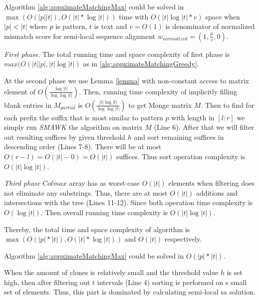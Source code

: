 \begin{theorem}
Algorithm \ref{alg:appximateMatchingMax} could  be solved in
$\max (O(|p||t|), O(|t|* \log |t|))$ time with $O(|t|  \log {|t| * v })$ space when $|p|<|t|$ where $p$ is pattern, $t$ is text and $v=O(1)$ is denominator of normalized mismatch score for semi-local sequence alignment
$w_{normalized} = (1,\frac{\mu}{v},0)$.
\end{theorem}

\emph{First phase}.
The total running time and space complexity of first phase is 
$max(O(|t||p|, |t| \log |t|)$ as in \ref{alg:appximateMatchingGreedy}.


At the second phase we use Lemma \ref{lemma} with non-constant access to matrix element of $O(\frac{\log |t|}{\log \log |t|})$.
Then, running time complexity of implicitly filling
blank entries in $M_{partial}$ is 
$O(\frac{|t| \log |t|}{\log \log |t|})$ to get Monge matrix $M$.
Then to find for each prefix the suffix that is most similar to pattern $p$ with length in $[l:r]$ we simply run \emph{SMAWK}
the algorithm on matrix $M$ (Line 6).
After that we will filter out resulting suffices by given threshold $h$ and sort remaining suffices in descending order (Lines 7-8).
There will be at most $O(r-l)=O(|t| - 0) = O(|t|)$ suffices.
Thus sort operation complexity  is $O(|t| \log |t|)$.

\emph{Third phase}
$Colmax$ array has as worst-case $O(|t|)$ elements when filtering does not eliminate any substrings.
Thus, 
there are at most $O(|t|)$ additions and intersections with the tree (Lines 11-12).
Since both operation time complexity is  $O(\log |t|)$.
Then overall running time complexity is $O(|t|\log |t|)$.

Thereby, the total time and space complexity of algorithm is $\max (O(|p|*|t|), O(|t|* \log |t| ))$ and $O(|t|)$  respectively.
 

\begin{corollary}
Algorithm \ref{alg:appximateMatchingMax} could  be solved in 
$O(|p| * |t|)$.

When the amount of clones is relatively small and the threshold value $h$ is set high,  then after filtering out $t$ intervals (Line 4) sorting is performed on s small set of elements.
Thus, this part is dominated by calculating semi-local sa solution.
\end{corollary}







  


 
